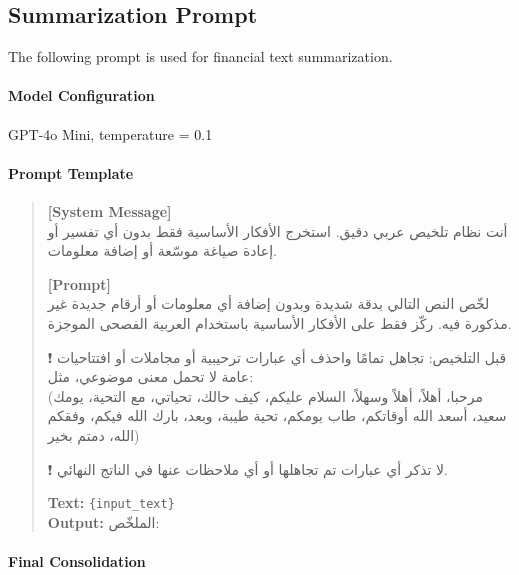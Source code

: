 \documentclass[10pt,a4paper]{article}
\begin{document}
\subsection{Summarization Prompt}

The following prompt is used for financial text summarization.

\paragraph{Model Configuration}
GPT-4o Mini, temperature = 0.1

\paragraph{Prompt Template}

\begin{quote}
\small
\textbf{[System Message]}\\
\textarabic{أنت نظام تلخيص عربي دقيق. استخرج الأفكار الأساسية فقط بدون أي تفسير أو إعادة صياغة موسّعة أو إضافة معلومات.}

\vspace{0.5em}
\textbf{[Prompt]}\\
\textarabic{لخّص النص التالي بدقة شديدة وبدون إضافة أي معلومات أو أرقام جديدة غير مذكورة فيه. ركّز فقط على الأفكار الأساسية باستخدام العربية الفصحى الموجزة.}

\vspace{0.5em}
\textarabic{❗ قبل التلخيص: تجاهل تمامًا واحذف أي عبارات ترحيبية أو مجاملات أو افتتاحيات عامة لا تحمل معنى موضوعي، مثل:}\\
\textarabic{(مرحبا، أهلاً، أهلاً وسهلاً، السلام عليكم، كيف حالك، تحياتي، مع التحية، يومك سعيد، أسعد الله أوقاتكم، طاب يومكم، تحية طيبة، وبعد، بارك الله فيكم، وفقكم الله، دمتم بخير)}

\vspace{0.5em}
\textarabic{❗ لا تذكر أي عبارات تم تجاهلها أو أي ملاحظات عنها في الناتج النهائي.}

\vspace{0.5em}
\textbf{Text:} \texttt{\{input\_text\}}\\
\textbf{Output:} \textarabic{الملخّص:}
\end{quote}

\paragraph{Final Consolidation}
\end{document}

